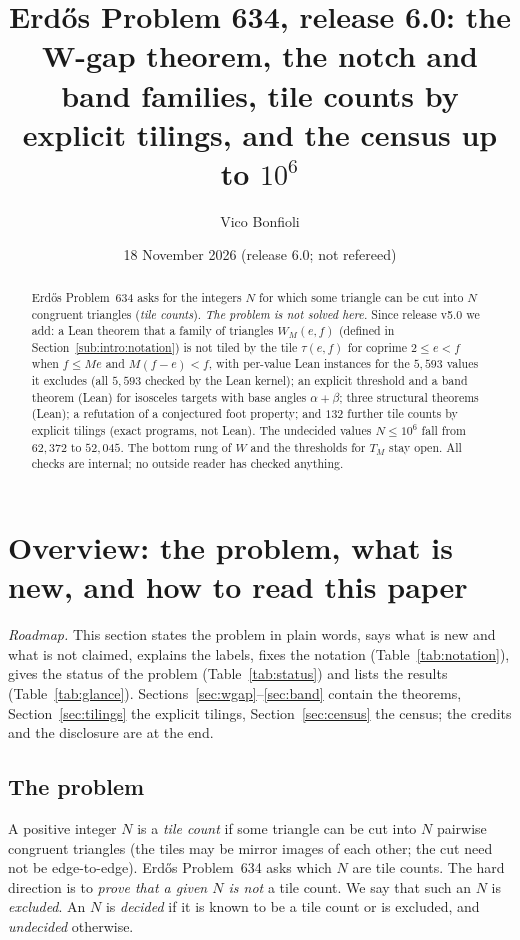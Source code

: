 \documentclass[11pt,reqno]{amsart}
\title[Release 6.0]{Erd\H{o}s Problem 634, release 6.0: the W-gap theorem, the notch and band families, tile counts by explicit tilings, and the census up to $10^6$}
\author{Vico Bonfioli}
\date{18 November 2026 (release 6.0; not refereed)}
\theoremstyle{plain}
\theoremstyle{definition}
\begin{document}
\begin{abstract}
Erd\H{o}s Problem~634 asks for the integers $N$ for which some triangle can be cut into $N$ congruent triangles
(\emph{tile counts}). \emph{The problem is not solved here.} Since release v5.0 we add: a Lean theorem that a family of
triangles $W_M(e,f)$ (defined in Section~\ref{sub:intro:notation}) is not tiled by the tile $\tau(e,f)$ for coprime
$2\le e<f$ when $f\le Me$ and $M(f-e)<f$, with per-value Lean instances for the $5{,}593$
values it excludes (all $5{,}593$ checked by the Lean kernel); an explicit threshold and a band theorem (Lean) for isosceles targets
with base angles $\alpha+\beta$; three structural theorems (Lean); a refutation of a conjectured foot property;
and $132$ further tile counts by explicit tilings (exact programs, not Lean). The undecided values $N\le10^6$ fall
from $62{,}372$ to $52{,}045$. The bottom rung of $W$ and the thresholds for $T_M$ stay open. All checks are internal; no outside reader has checked anything.
\end{abstract}
\maketitle

\section{Overview: the problem, what is new, and how to read this paper}\label{sec:intro}

\emph{Roadmap.} This section states the problem in plain words, says what is new and what is not claimed, explains the
labels, fixes the notation (Table~\ref{tab:notation}), gives the status of the problem (Table~\ref{tab:status}) and
lists the results (Table~\ref{tab:glance}). Sections~\ref{sec:wgap}--\ref{sec:band} contain the theorems,
Section~\ref{sec:tilings} the explicit tilings, Section~\ref{sec:census} the census; the credits and the disclosure are at the end.

\subsection{The problem}\label{sub:intro:problem}
A positive integer $N$ is a \emph{tile count} if some triangle can be cut into $N$ pairwise congruent triangles
(the tiles may be mirror images of each other; the cut need not be edge-to-edge). Erd\H{o}s Problem~634 asks which $N$ are
tile counts. The hard direction is to \emph{prove that
a given $N$ is not} a tile count. We say that such an $N$ is \emph{excluded}. An $N$ is \emph{decided} if it is
known to be a tile count or is excluded, and \emph{undecided} otherwise.
\end{document}
